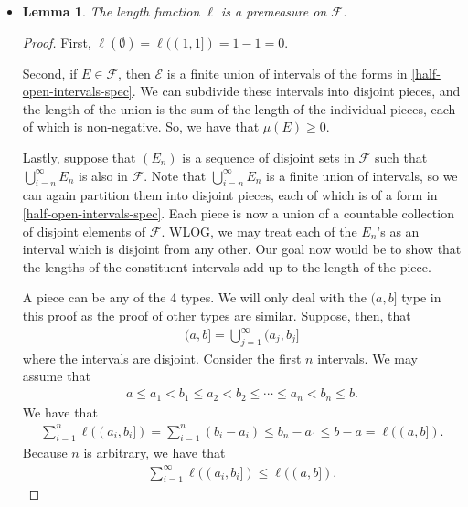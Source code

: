 \documentclass[10pt]{article}
\newtheorem{lemma}{Lemma}
\newcommand{\mcal}[1]{\mathcal{#1}}
\begin{document}
\begin{itemize}
  \item \begin{lemma} \label{lemma:length-is-premeasure}
    The length function $\ell$ is a premeasure on $\mcal{F}$.
  \end{lemma}

  \begin{proof}
    First, $\ell(\emptyset) = \ell((1,1]) = 1 - 1 = 0$.

    Second, if $E \in \mcal{F}$, then $\mcal{E}$ is a finite union of intervals of the forms in \eqref{half-open-intervals-spec}. We can subdivide these intervals into disjoint pieces, and the length of the union is the sum of the length of the individual pieces, each of which is non-negative. So, we have that $\mu(E) \geq 0$.

    Lastly, suppose that $(E_n)$ is a sequence of disjoint sets in $\mcal{F}$ such that $\bigcup_{i=n}^\infty E_n$ is also in $\mcal{F}$. Note that $\bigcup_{i=n}^\infty E_n$ is a finite union of intervals, so we can again partition them into disjoint pieces, each of which is of a form in \eqref{half-open-intervals-spec}. Each piece is now a union of a countable collection of disjoint elements of $\mcal{F}$. WLOG, we may treat each of the $E_n$'s as an interval which is disjoint from any other. Our goal now would be to show that the lengths of the constituent intervals add up to the length of the piece.

    A piece can be any of the 4 types. We will only deal with the $(a,b]$ type in this proof as the proof of other types are similar. Suppose, then, that
    \begin{align*}
      (a,b] = \bigcup_{j=1}^\infty (a_j, b_j]
    \end{align*}
    where the intervals are disjoint. Consider the first $n$ intervals. We may assume that
    \begin{align*}
      a \leq a_1 < b_1 \leq a_2 < b_2 \leq \dotsb \leq a_n < b_n \leq b.
    \end{align*}
    We have that
    \begin{align*}
      \sum_{i=1}^n \ell((a_i, b_i]) = \sum_{i=1}^n (b_i - a_i) \leq b_n - a_1 \leq b-a = \ell((a,b]).
    \end{align*}
    Because $n$ is arbitrary, we have that    
    \begin{align*}
      \sum_{i=1}^\infty \ell((a_i, b_i]) \leq \ell((a,b]).
    \end{align*}


\end{proof}
\end{itemize}
\end{document}
